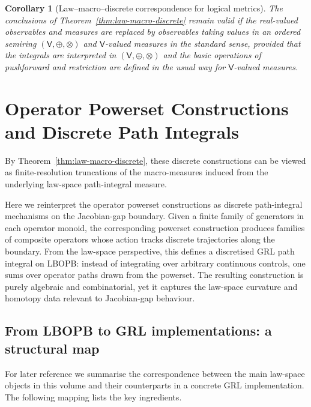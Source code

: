 \documentclass[11pt]{book}
\theoremstyle{plain}
\newtheorem{corollary}[theorem]{Corollary}
\theoremstyle{definition}
\theoremstyle{remark}
\begin{document}
\begin{corollary}[Law--macro--discrete correspondence for logical metrics]
\label{cor:law-macro-discrete-logical}
The conclusions of Theorem~\ref{thm:law-macro-discrete} remain valid if
the real-valued observables and measures are replaced by observables
taking values in an ordered semiring $(\mathsf{V},\oplus,\otimes)$ and
$\mathsf{V}$-valued measures in the standard sense, provided that the
integrals are interpreted in $(\mathsf{V},\oplus,\otimes)$ and the
basic operations of pushforward and restriction are defined in the
usual way for $\mathsf{V}$-valued measures.
\end{corollary}



\section{Operator Powerset Constructions and Discrete Path Integrals}


By Theorem~\ref{thm:law-macro-discrete}, these discrete constructions
can be viewed as finite-resolution truncations of the macro-measures
induced from the underlying law-space path-integral measure.

Here we reinterpret the operator powerset constructions as discrete
path-integral mechanisms on the Jacobian-gap boundary. Given a finite
family of generators in each operator monoid, the corresponding powerset
construction produces families of composite operators whose action
tracks discrete trajectories along the boundary. From the law-space
perspective, this defines a discretised GRL path integral on LBOPB:
instead of integrating over arbitrary continuous controls, one sums
over operator paths drawn from the powerset. The resulting
construction is purely algebraic and combinatorial, yet it captures the
law-space curvature and homotopy data relevant to Jacobian-gap
behaviour.

\subsection{From LBOPB to GRL implementations: a structural map}

For later reference we summarise the correspondence between the main
law-space objects in this volume and their counterparts in a concrete
GRL implementation. The following mapping lists the key ingredients.
\end{document}

